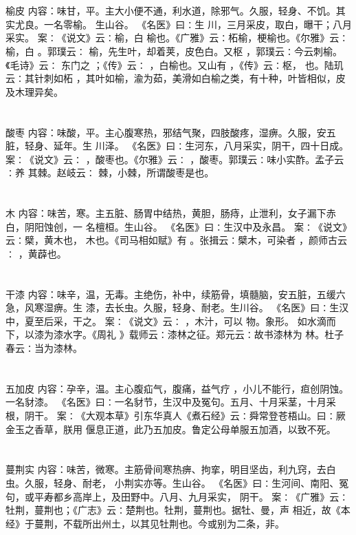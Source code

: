 \documentclass[12pt,UTF8]{ctexbook}
\begin{document}
\section{}榆皮
内容：味甘，平。主大小便不通，利水道，除邪气。久服，轻身、不饥。其实尤良。一名零榆。 
生山谷。 
《名医》曰∶生 川，三月采皮，取白，曝干；八月采实。 
案∶《说文》云∶榆，白 榆也。《广雅》云∶柘榆，梗榆也。《尔雅》云∶榆，白 
。郭璞云∶ 榆，先生叶，却着荚，皮色白。又枢 ，郭璞云∶今云刺榆。《毛诗》云∶ 
东门之 ；《传》云∶ ，白榆也。又山有 ，《传》云∶枢， 也。陆玑云∶其针刺如柘 
，其叶如榆，渝为茹，美滑如白榆之类，有十种，叶皆相似，皮及木理异矣。 


\section{}酸枣
内容：味酸，平。主心腹寒热，邪结气聚，四肢酸疼，湿痹。久服，安五脏，轻身、延年。生 
川泽。 
《名医》曰∶生河东，八月采实，阴干，四十日成。 
案∶《说文》云∶ ，酸枣也。《尔雅》云∶ ，酸枣。郭璞云∶味小实酢。孟子云∶养 
其棘。赵岐云∶ 棘，小棘，所谓酸枣是也。 


\section{}木
内容：味苦，寒。主五脏、肠胃中结热，黄胆，肠痔，止泄利，女子漏下赤白，阴阳蚀创，一 
名檀桓。生山谷。 
《名医》曰∶生汉中及永昌。 
案∶《说文》云∶檗，黄木也， 木也。《司马相如赋》有 。张揖云∶檗木，可染者 
，颜师古云∶ ，黄薜也。 


\section{}干漆
内容：味辛，温，无毒。主绝伤，补中，续筋骨，填髓脑，安五脏，五缓六急，风寒湿痹。生 
漆，去长虫。久服，轻身、耐老。生川谷。 
《名医》曰∶生汉中，夏至后采，干之。 
案∶《说文》云∶ ，木汁，可以 物。象形。 如水滴而下，以漆为漆水字。《周礼 
》载师云∶漆林之征。郑元云∶故书漆林为 林。杜子春云∶当为漆林。 


\section{}五加皮
内容：孕辛，温。主心腹疝气，腹痛，益气疗 ，小儿不能行，疸创阴蚀。一名豺漆。 
《名医》曰∶一名豺节，生汉中及冤句。五月、十月采茎，十月采根，阴干。 
案∶《大观本草》引东华真人《煮石经》云∶舜常登苍梧山。曰∶厥金玉之香草，朕用 
偃息正道，此乃五加皮。鲁定公母单服五加酒，以致不死。 


\section{}蔓荆实
内容：味苦，微寒。主筋骨间寒热痹、拘挛，明目坚齿，利九窍，去白虫。久服，轻身、耐老， 
小荆实亦等。生山谷。 
《名医》曰∶生河间、南阳、冤句，或平寿都乡高岸上，及田野中。八月、九月采实， 
阴干。 
案∶《广雅》云∶牡荆，蔓荆也；《广志》云∶楚荆也。牡荆，蔓荆也。据牡、曼，声 
相近，故《本经》于蔓荆，不载所出州土，以其见牡荆也。今或别为二条，非。 
\end{document}

